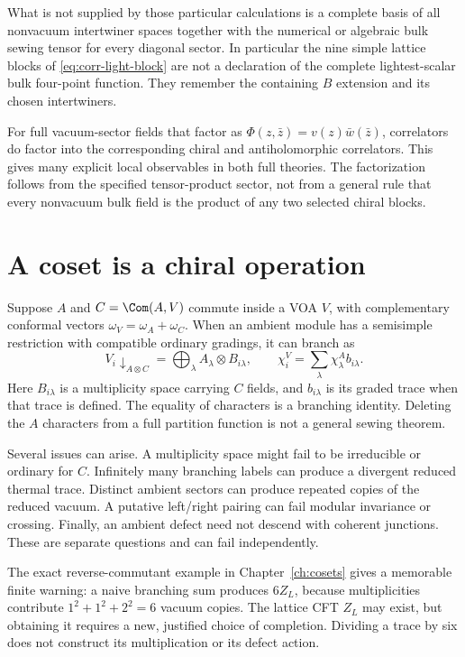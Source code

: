 What is not supplied by those particular calculations is a
complete basis of all nonvacuum intertwiner spaces together with
the numerical or algebraic bulk sewing tensor for every diagonal
sector. In particular the nine simple lattice blocks of
\eqref{eq:corr-light-block} are not a declaration of the complete
lightest-scalar bulk four-point function. They remember the
containing $B$ extension and its chosen intertwiners.

For full vacuum-sector fields that factor as
$\Phi(z,\bar z)=v(z)\bar w(\bar z)$, correlators do factor into
the corresponding chiral and antiholomorphic correlators. This
gives many explicit local observables in both full theories.
The factorization follows from the specified tensor-product
sector, not from a general rule that every nonvacuum bulk field
is the product of any two selected chiral blocks.

\section{A coset is a chiral operation}

Suppose $A$ and $C=\Com(A,V)$ commute inside a VOA $V$,
with complementary conformal vectors
$\omega_V=\omega_A+\omega_C$.
When an ambient module has a semisimple restriction with
compatible ordinary gradings, it can branch as
\begin{equation}
 V_i\downarrow_{A\otimes C}
 =\bigoplus_\lambda A_\lambda\otimes B_{i\lambda},
 \qquad
 \chi_i^V=\sum_\lambda\chi_\lambda^A b_{i\lambda}.
 \label{eq:sewing-branching}
\end{equation}
Here $B_{i\lambda}$ is a multiplicity space carrying $C$ fields,
and $b_{i\lambda}$ is its graded trace when that trace is defined.
The equality of characters is a branching identity. Deleting the
$A$ characters from a full partition function is not a general
sewing theorem.

Several issues can arise. A multiplicity space might fail to be
irreducible or ordinary for $C$. Infinitely many branching labels
can produce a divergent reduced thermal trace. Distinct ambient
sectors can produce repeated copies of the reduced vacuum. A
putative left/right pairing can fail modular invariance or crossing.
Finally, an ambient defect need not descend with coherent junctions.
These are separate questions and can fail independently.

The exact reverse-commutant example in
Chapter~\ref{ch:cosets} gives a memorable finite warning: a naive
branching sum produces $6Z_L$, because multiplicities contribute
$1^2+1^2+2^2=6$ vacuum copies. The lattice CFT $Z_L$ may exist,
but obtaining it requires a new, justified choice of completion.
Dividing a trace by six does not construct its multiplication or
its defect action.

